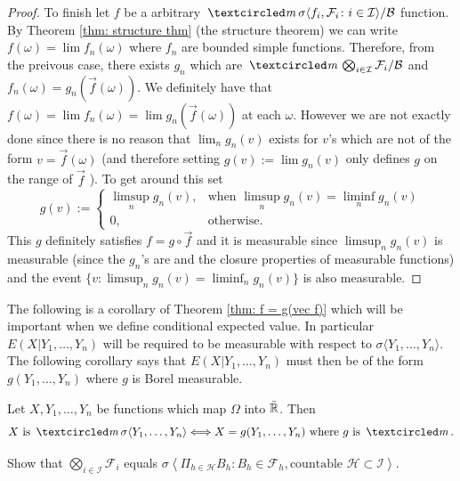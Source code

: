 \begin{proof}
To finish let $f$ be a arbitrary $\mcirc \sigma\langle f_i, \mathcal F_i\colon i\in\mathcal I \rangle/\mathcal B$ function. By Theorem \ref{thm: structure thm} (the structure theorem) we can write $f(\omega) = \lim f_n(\omega)$ where $f_n$ are bounded simple functions. Therefore, from the preivous case, there exists $g_n$ which are $\mcirc \bigotimes_{i\in \mathcal I} \mathcal F_i / \mathcal B$ and $f_n(\omega) = g_n(\vec f(\omega))$. We definitely have that $f(\omega) = \lim f_n(\omega) = \lim g_n(\vec f(\omega))$ at each $\omega$. However we are not exactly done since there is no reason that $\lim_n g_n(v)$ exists for $v$'s which are not of the form $v=\vec f(\omega)$ (and therefore setting $g(v):=\lim g_n(v)$ only defines $g$ on the range of $\vec f$ ). To get around this set
\[
g(v):=\begin{cases}
\limsup_ng_n(v), &\text{when $\limsup_ng_n(v) =  \liminf_ng_n(v)$}\\
0, &\text{otherwise}.
\end{cases}
\]
This $g$ definitely satisfies $f = g \circ \vec f$ and it is measurable since $\limsup_ng_n(v)$ is measurable (since the $g_n$'s are and the closure properties of measurable functions) and the event $\{v\colon \limsup_ng_n(v) =  \liminf_ng_n(v)  \}$ is also measurable.
\end{proof}



The following is a corollary of Theorem \ref{thm: f = g(vec f)} which will be important when we define conditional expected value. In particular $E(X | Y_1,\ldots, Y_n)$ will be required to be measurable with respect to $\sigma\langle Y_1, \ldots, Y_n\rangle$. The following corollary says that $E(X | Y_1,\ldots, Y_n)$ must then be of the form $g(Y_1,\ldots, Y_n)$ where $g$ is Borel measurable.
\begin{corollary}
\label{cor: funs of measurable funs}
Let $X, Y_1, \ldots, Y_n$ be functions which map $\Omega$ into $\bar{\Bbb R}$.
Then
\[
\text{$X$ is  $\mcirc \sigma\langle  Y_1, \ldots, Y_n \rangle \Longleftrightarrow X = g(Y_1,\ldots, Y_n)$ where $g$ is $\mcirc$}.
\]
\end{corollary}



\begin{exercise}
Show that $\textstyle\bigotimes_{i\in \mathcal I} \mathcal F_i$ equals $\sigma\left\langle \Pi_{h\in \mathcal H} B_h \colon  B_h\in \mathcal F_h, \text{countable $\mathcal H\subset \mathcal I$}\right\rangle $.
\end{exercise}

